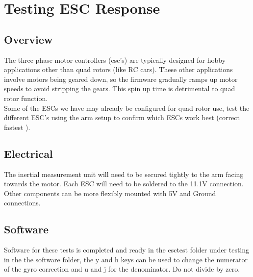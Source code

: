 \documentclass[12pt,letterpaper]{article}
\begin{document}
\section{Testing ESC Response}
\subsection{Overview}
The three phase motor controllers (esc's) are typically designed for hobby
applications other than quad rotors (like RC cars). These other applications
involve motors being geared down, so the firmware gradually ramps up motor
speeds to avoid stripping the gears. This spin up time is detrimental to
quad rotor function.\\
Some of the ESCs we have may already be configured for quad rotor use, test
the different ESC's using the arm setup to confirm which ESCs work best
(correct fastest ).
\subsection{Electrical}
The inertial measurement unit will need to be secured tightly to the arm facing
towards the motor. Each ESC will need to be soldered to the 11.1V connection.
Other components can be more flexibly mounted with 5V and Ground connections.
\subsection{Software}
Software for these tests is completed and ready in the esctest folder under
testing in the the software folder, the y and h keys can be used to change
the numerator of the gyro correction and u and j for the denominator. Do not
divide by zero.
\end{document}
